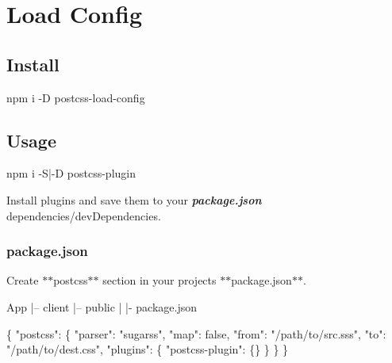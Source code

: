 \href{https://npmjs.com/package/postcss-load-config}{\tt } \href{https://nodejs.org/}{\tt } \href{https://david-dm.org/michael-ciniawsky/postcss-load-config}{\tt } \href{https://travis-ci.org/michael-ciniawsky/postcss-load-config}{\tt } \href{https://coveralls.io/github/michael-ciniawsky/postcss-load-config}{\tt } \href{http://standardjs.com/}{\tt } \href{https://gitter.im/postcss/postcss}{\tt }

  \href{https://github.com/postcss/postcss}{\tt }  \section*{Load Config}

 

\subsection*{Install}


\begin{DoxyCode}
npm i -D postcss-load-config
\end{DoxyCode}


\subsection*{Usage}


\begin{DoxyCode}
npm i -S|-D postcss-plugin
\end{DoxyCode}


Install plugins and save them to your {\itshape {\bfseries package.\+json}} dependencies/dev\+Dependencies.

\subsubsection*{{\ttfamily package.\+json}}

Create $\ast$$\ast${\ttfamily postcss}$\ast$$\ast$ section in your projects $\ast$$\ast${\ttfamily package.\+json}$\ast$$\ast$.


\begin{DoxyCode}
App
  |– client
  |– public
  |
  |- package.json
\end{DoxyCode}



\begin{DoxyCode}
\{
  "postcss": \{
    "parser": "sugarss",
    "map": false,
    "from": "/path/to/src.sss",
    "to": "/path/to/dest.css",
    "plugins": \{
      "postcss-plugin": \{\}
    \}
  \}
\}
\end{DoxyCode}


